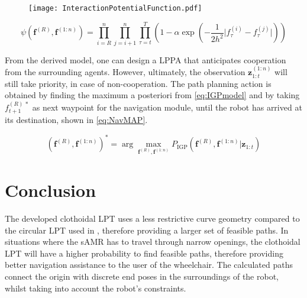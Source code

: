 \begin{figure}[!tbp]
	\centering
    \texttt{[image: InteractionPotentialFunction.pdf]}
\vspace{-1.5em}
\end{figure}

\begin{equation}
\psi({\bm f}^{(R)}, {\bm f^{(1:n)}})= \prod^{n}_{i=R}\prod^{n}_{j=i+1}\prod^{T}_{\tau=t}\left(1-\alpha\exp (-\frac{1}{2h^{2}}\vert f_{\tau}^{(i)}-f_{\tau}^{(j)}\vert)\right) \label{eq:InterPotFunc}
\end{equation}

From the derived model, one can design a LPPA that anticipates cooperation from the surrounding agents. However, ultimately, the observation ${\bm z}^{(1:n)}_{1:t}$ will still take priority, in case of non-cooperation. The path planning action is obtained by finding the maximum a posteriori from \cref{eq:IGPmodel} and by taking $f_{t+1}^{(R)\,\ast}$ as next waypoint for the navigation module, until the robot has arrived at its destination, shown in \cref{eq:NavMAP}.

\begin{equation}
({\bm f}^{(R)}, {\bm f^{(1:n)}})^{\ast}=\arg\max_{{\bm f}^{(R)},{\bm f^{(1:n)}}} P_{\text{IGP}} ({\bm f}^{(R)}, {\bm f^{(1:n)}}\vert {\bm z}_{1:t}) \label{eq:NavMAP}
\end{equation}

\section{Conclusion} \label{sec:DesignConclusion}
The developed clothoidal LPT uses a less restrictive curve geometry compared to the circular LPT used in \cite{DemeesterEtAl2012}, therefore providing a larger set of feasible paths. In situations where the sAMR has to travel through narrow openings, the clothoidal LPT will have a higher probability to find feasible paths, therefore providing better navigation assistance to the user of the wheelchair. The calculated paths connect the origin with discrete end poses in the surroundings of the robot, whilst taking into account the robot's constraints. 

